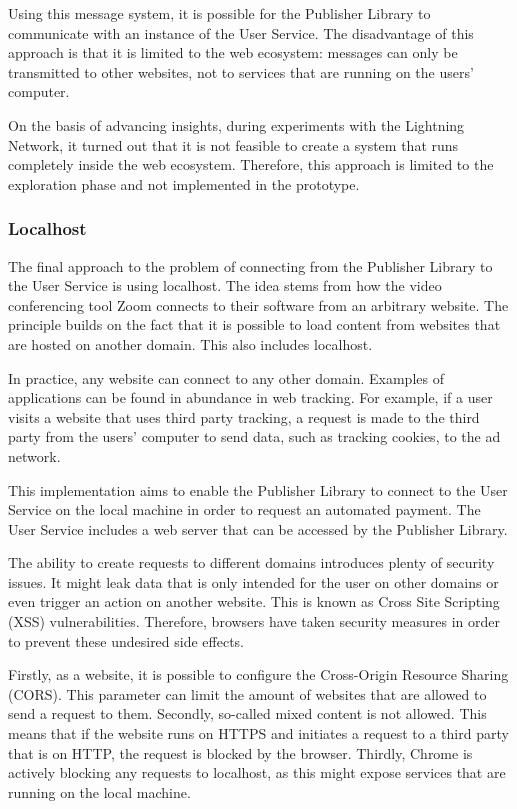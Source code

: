 Using this message system, it is possible for the Publisher Library to communicate with an instance of the User Service. The disadvantage of this approach is that it is limited to the web ecosystem: messages can only be transmitted to other websites, not to services that are running on the users' computer. 

On the basis of advancing insights, during experiments with the Lightning Network, it turned out that it is not feasible to create a system that runs completely inside the web ecosystem. Therefore, this approach is limited to the exploration phase and not implemented in the prototype.

\subsubsection{Localhost}
\label{sec:localhost}

The final approach to the problem of connecting from the Publisher Library to the User Service is using localhost. The idea stems from how the video conferencing tool Zoom connects to their software from an arbitrary website. The principle builds on the fact that it is possible to load content from websites that are hosted on another domain. This also includes localhost.

In practice, any website can connect to any other domain. Examples of applications can be found in abundance in web tracking. For example, if a user visits a website that uses third party tracking, a request is made to the third party from the users' computer to send data, such as tracking cookies, to the ad network. 

This implementation aims to enable the Publisher Library to connect to the User Service on the local machine in order to request an automated payment. The User Service includes a web server that can be accessed by the Publisher Library. 

The ability to create requests to different domains introduces plenty of security issues. It might leak data that is only intended for the user on other domains or even trigger an action on another website. This is known as Cross Site Scripting (XSS) vulnerabilities. Therefore, browsers have taken security measures in order to prevent these undesired side effects.

Firstly, as a website, it is possible to configure the Cross-Origin Resource Sharing (CORS). This parameter can limit the amount of websites that are allowed to send a request to them. Secondly, so-called mixed content is not allowed. This means that if the website runs on HTTPS and initiates a request to a third party that is on HTTP, the request is blocked by the browser. Thirdly, Chrome is actively blocking any requests to localhost, as this might expose services that are running on the local machine.

